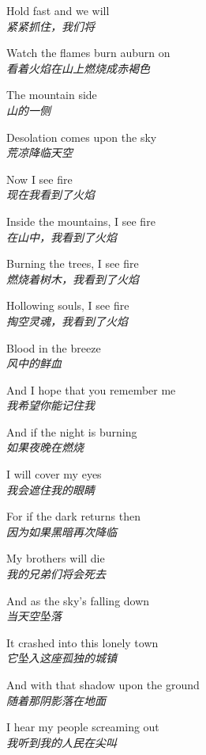 \begin{spacing}{1.5}
\begin{flushleft}
Hold fast and we will\\
\textit{紧紧抓住，我们将}\lyricspace

Watch the flames burn auburn on\\
\textit{看着火焰在山上燃烧成赤褐色}\lyricspace

The mountain side\\
\textit{山的一侧}\lyricspace

Desolation comes upon the sky\\
\textit{荒凉降临天空}\lyricspace

Now I see fire\\
\textit{现在我看到了火焰}\lyricspace

Inside the mountains, I see fire\\
\textit{在山中，我看到了火焰}\lyricspace

Burning the trees, I see fire\\
\textit{燃烧着树木，我看到了火焰}\lyricspace

Hollowing souls, I see fire\\
\textit{掏空灵魂，我看到了火焰}\lyricspace

Blood in the breeze\\
\textit{风中的鲜血}\lyricspace

And I hope that you remember me\\
\textit{我希望你能记住我}\lyricspace

And if the night is burning\\
\textit{如果夜晚在燃烧}\lyricspace

I will cover my eyes\\
\textit{我会遮住我的眼睛}\lyricspace

For if the dark returns then\\
\textit{因为如果黑暗再次降临}\lyricspace

My brothers will die\\
\textit{我的兄弟们将会死去}\lyricspace

And as the sky's falling down\\
\textit{当天空坠落}\lyricspace

It crashed into this lonely town\\
\textit{它坠入这座孤独的城镇}\lyricspace

And with that shadow upon the ground\\
\textit{随着那阴影落在地面}\lyricspace

I hear my people screaming out\\
\textit{我听到我的人民在尖叫}\lyricspace


\end{flushleft}
\end{spacing}
